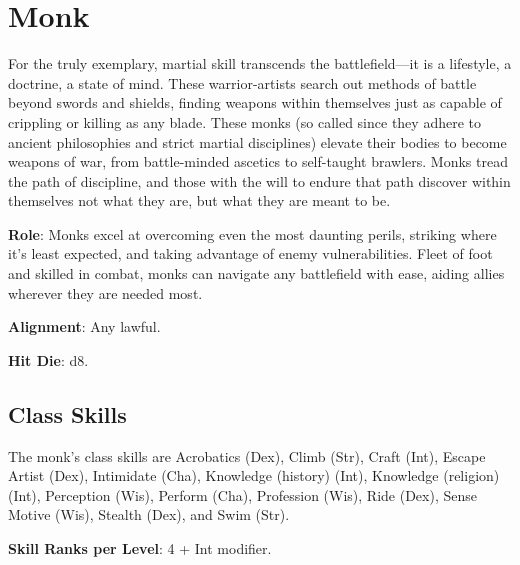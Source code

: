 \section{Monk}

\label{f0}				
For the truly exemplary, martial skill transcends the battlefield---it is a lifestyle, a doctrine, a state of mind. These warrior-artists search out methods of battle beyond swords and shields, finding weapons within themselves just as capable of crippling or killing as any blade. These monks (so called since they adhere to ancient philosophies and strict martial disciplines) elevate their bodies to become weapons of war, from battle-minded ascetics to self-taught brawlers. Monks tread the path of discipline, and those with the will to endure that path discover within themselves not what they are, but what they are meant to be.
				
\textbf{Role}: Monks excel at overcoming even the most daunting perils, striking where it's least expected, and taking advantage of enemy vulnerabilities. Fleet of foot and skilled in combat, monks can navigate any battlefield with ease, aiding allies wherever they are needed most.
				
\textbf{Alignment}: Any lawful.
				
\textbf{Hit Die}: d8.
				
\subsection{Class Skills}

				
The monk's class skills are Acrobatics (Dex), Climb (Str), Craft (Int), Escape Artist (Dex), Intimidate (Cha), Knowledge (history) (Int), Knowledge (religion) (Int), Perception (Wis), Perform (Cha), Profession (Wis), Ride (Dex), Sense Motive (Wis), Stealth (Dex), and Swim (Str).
				
\textbf{Skill Ranks per Level}: 4 + Int modifier.

